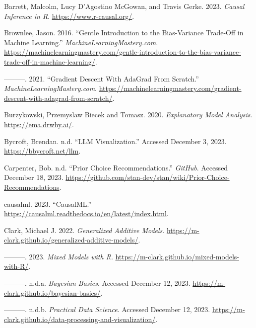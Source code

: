 \documentclass[
  letterpaper,
]{krantz}
\newlength{\cslhangindent}
\newenvironment{CSLReferences}[2] %
 {\begin{list}{}{%
  \setlength{\itemindent}{0pt}
  \setlength{\leftmargin}{0pt}
  \setlength{\parsep}{0pt}
  \ifodd #1
   \setlength{\leftmargin}{\cslhangindent}
   \setlength{\itemindent}{-1\cslhangindent}
  \fi
  \setlength{\itemsep}{#2\baselineskip}}}
 {\end{list}}
\begin{document}
\label{refs}
\begin{CSLReferences}{1}{0}
Barrett, Malcolm, Lucy D'Agostino McGowan, and Travis Gerke. 2023.
\emph{Causal {Inference} in {R}}. \url{https://www.r-causal.org/}.

Brownlee, Jason. 2016. {``Gentle {Introduction} to the {Bias}-{Variance}
{Trade}-{Off} in {Machine} {Learning}.''}
\emph{MachineLearningMastery.com}.
\url{https://machinelearningmastery.com/gentle-introduction-to-the-bias-variance-trade-off-in-machine-learning/}.

---------. 2021. {``Gradient {Descent} {With} {AdaGrad} {From}
{Scratch}.''} \emph{MachineLearningMastery.com}.
\url{https://machinelearningmastery.com/gradient-descent-with-adagrad-from-scratch/}.

Burzykowski, Przemyslaw Biecek and Tomasz. 2020. \emph{Explanatory
{Model} {Analysis}}. \url{https://ema.drwhy.ai/}.

Bycroft, Brendan. n.d. {``{LLM} {Visualization}.''} Accessed December 3,
2023. \url{https://bbycroft.net/llm}.

Carpenter, Bob. n.d. {``Prior {Choice} {Recommendations}.''}
\emph{GitHub}. Accessed December 18, 2023.
\url{https://github.com/stan-dev/stan/wiki/Prior-Choice-Recommendations}.

causalml. 2023. {``{CausalML}.''}
\url{https://causalml.readthedocs.io/en/latest/index.html}.

Clark, Michael J. 2022. \emph{Generalized {Additive} {Models}}.
\url{https://m-clark.github.io/generalized-additive-models/}.

---------. 2023. \emph{Mixed {Models} with {R}}.
\url{https://m-clark.github.io/mixed-models-with-R/}.

---------. n.d.a. \emph{Bayesian {Basics}}. Accessed December 12, 2023.
\url{https://m-clark.github.io/bayesian-basics/}.

---------. n.d.b. \emph{Practical {Data} {Science}}. Accessed December
12, 2023.
\url{https://m-clark.github.io/data-processing-and-visualization/}.


\end{CSLReferences}
\end{document}
